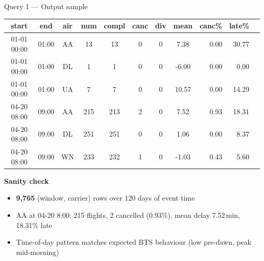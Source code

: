 \documentclass[aspectratio=169,10pt]{beamer}
\begin{document}
\begin{frame}{Query 1 — Output sample}
\centering\footnotesize
\begin{tabular}{ccccccccrrr}
\toprule
\textbf{start} & \textbf{end} & \textbf{air} & \textbf{num} & \textbf{compl} & \textbf{canc} & \textbf{div} & \textbf{mean} & \textbf{canc\%} & \textbf{late\%} \\
\midrule
01-01 00:00 & 01:00 & AA & 13  & 13  & 0 & 0 & 7.38  & 0.00 & 30.77 \\
01-01 00:00 & 01:00 & DL & 1   & 1   & 0 & 0 & -6.00 & 0.00 & 0.00  \\
01-01 00:00 & 01:00 & UA & 7   & 7   & 0 & 0 & 10.57 & 0.00 & 14.29 \\
04-20 08:00 & 09:00 & AA & 215 & 213 & 2 & 0 & 7.52  & 0.93 & 18.31 \\
04-20 08:00 & 09:00 & DL & 251 & 251 & 0 & 0 & 1.06  & 0.00 & 8.37  \\
04-20 08:00 & 09:00 & WN & 233 & 232 & 1 & 0 & -1.03 & 0.43 & 5.60  \\
\bottomrule
\end{tabular}

\vspace{1em}
{\color{sabdNavy}\textbf{Sanity check}}
\begin{itemize}\footnotesize
  \item \textbf{9{,}765} (window, carrier) rows over 120 days of event time
  \item AA at 04-20 8:00: 215 flights, 2 cancelled (0.93\%), mean delay 7.52\,min, 18.31\% late
  \item Time-of-day pattern matches expected BTS behaviour (low pre-dawn, peak mid-morning)
\end{itemize}
\end{frame}
\end{document}
